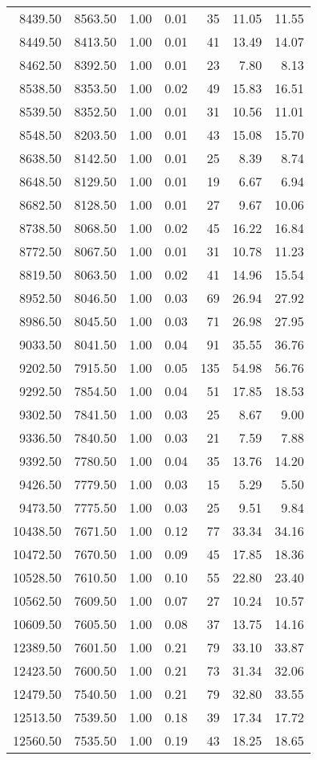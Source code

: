 \begin{table}
\begin{tabular}{rrrrrrr}
8439.50 & 8563.50 & 1.00 & 0.01 & 35 & 11.05 & 11.55 \\
8449.50 & 8413.50 & 1.00 & 0.01 & 41 & 13.49 & 14.07 \\
8462.50 & 8392.50 & 1.00 & 0.01 & 23 & 7.80 & 8.13 \\
8538.50 & 8353.50 & 1.00 & 0.02 & 49 & 15.83 & 16.51 \\
8539.50 & 8352.50 & 1.00 & 0.01 & 31 & 10.56 & 11.01 \\
8548.50 & 8203.50 & 1.00 & 0.01 & 43 & 15.08 & 15.70 \\
8638.50 & 8142.50 & 1.00 & 0.01 & 25 & 8.39 & 8.74 \\
8648.50 & 8129.50 & 1.00 & 0.01 & 19 & 6.67 & 6.94 \\
8682.50 & 8128.50 & 1.00 & 0.01 & 27 & 9.67 & 10.06 \\
8738.50 & 8068.50 & 1.00 & 0.02 & 45 & 16.22 & 16.84 \\
8772.50 & 8067.50 & 1.00 & 0.01 & 31 & 10.78 & 11.23 \\
8819.50 & 8063.50 & 1.00 & 0.02 & 41 & 14.96 & 15.54 \\
8952.50 & 8046.50 & 1.00 & 0.03 & 69 & 26.94 & 27.92 \\
8986.50 & 8045.50 & 1.00 & 0.03 & 71 & 26.98 & 27.95 \\
9033.50 & 8041.50 & 1.00 & 0.04 & 91 & 35.55 & 36.76 \\
9202.50 & 7915.50 & 1.00 & 0.05 & 135 & 54.98 & 56.76 \\
9292.50 & 7854.50 & 1.00 & 0.04 & 51 & 17.85 & 18.53 \\
9302.50 & 7841.50 & 1.00 & 0.03 & 25 & 8.67 & 9.00 \\
9336.50 & 7840.50 & 1.00 & 0.03 & 21 & 7.59 & 7.88 \\
9392.50 & 7780.50 & 1.00 & 0.04 & 35 & 13.76 & 14.20 \\
9426.50 & 7779.50 & 1.00 & 0.03 & 15 & 5.29 & 5.50 \\
9473.50 & 7775.50 & 1.00 & 0.03 & 25 & 9.51 & 9.84 \\
10438.50 & 7671.50 & 1.00 & 0.12 & 77 & 33.34 & 34.16 \\
10472.50 & 7670.50 & 1.00 & 0.09 & 45 & 17.85 & 18.36 \\
10528.50 & 7610.50 & 1.00 & 0.10 & 55 & 22.80 & 23.40 \\
10562.50 & 7609.50 & 1.00 & 0.07 & 27 & 10.24 & 10.57 \\
10609.50 & 7605.50 & 1.00 & 0.08 & 37 & 13.75 & 14.16 \\
12389.50 & 7601.50 & 1.00 & 0.21 & 79 & 33.10 & 33.87 \\
12423.50 & 7600.50 & 1.00 & 0.21 & 73 & 31.34 & 32.06 \\
12479.50 & 7540.50 & 1.00 & 0.21 & 79 & 32.80 & 33.55 \\
12513.50 & 7539.50 & 1.00 & 0.18 & 39 & 17.34 & 17.72 \\
12560.50 & 7535.50 & 1.00 & 0.19 & 43 & 18.25 & 18.65 \\
\bottomrule
\end{tabular}
\end{table}
